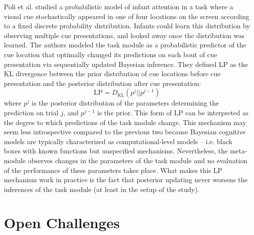 Poli et al. \parencite{poli_infants_2020} studied a probabilistic model of infant attention in a task where a visual cue stochastically appeared in one of four locations on the screen according to a fixed discrete probability distribution. Infants could learn this distribution by observing multiple cue presentations, and looked away once the distribution was learned. The authors modeled the task module as a probabilistic predictor of the cue location that optimally changed its predictions on each bout of cue presentation via sequentially updated Bayesian inference. They defined \ac{LP} as the KL divergence between the prior distribution of cue locations before cue presentation and the posterior distribution after cue presentation:
\begin{equation}
    \mathrm{LP} = D_{\mathrm{KL}}(p^j||p^{j-1})
\end{equation}
where $p^j$ is the posterior distribution of the parameters determining the prediction on trial $j$, and $p^{j-1}$ is the prior. This form of \ac{LP} can be interpreted as the degree to which predictions of the task module change. This mechanism may seem less introspective compared to the previous two because Bayesian cognitive models are typically characterized as computational-level models -- i.e. black boxes with known functions but unspecified mechanisms. Nevertheless, the meta-module observes changes in the parameters of the task module and no evaluation of the performance of these parameters takes place. What makes this \ac{LP} mechanism work in practice is the fact that posterior updating never worsens the inferences of the task module (at least in the setup of the study).

\section{Open Challenges}\label{ch5:open_challenges}

